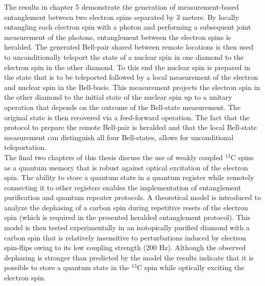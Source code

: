 The results in chapter 5 demonstrate the generation of measurement-based entanglement between two electron spins separated by 3 meters. By locally entangling each electron spin with a photon and performing a subsequent joint measurement of the photons, entanglement between the electron spins is heralded. The generated Bell-pair shared between remote locations is then used to unconditionally teleport the state of a nuclear spin in one diamond to the electron spin in the other diamond. To this end the nuclear spin is prepared in the state that is to be teleported followed by a local measurement of the electron and nuclear spin in the Bell-basis. This measurement projects the electron spin in the other diamond to the initial state of the nuclear spin up to a unitary operation that depends on the outcome of the Bell-state measurement. The original state is then recovered via a feed-forward operation. The fact that the protocol to prepare the remote Bell-pair is heralded and that the local Bell-state measurement can distinguish all four Bell-states, allows for unconditional teleportation. \\

The final two chapters of this thesis discuss the use of weakly coupled $^{13}$C spins as a quantum memory that is robust against optical excitation of the electron spin. The ability to store a quantum state in a quantum register while remotely connecting it to other registers enables the implementation of entanglement purification and quantum repeater protocols. A theoretical model is introduced to analyze the dephasing of a carbon spin during repetitive resets of the electron spin (which is required in the presented heralded entanglement protocol). This model is then tested experimentally in an isotopically purified diamond with a carbon spin that is relatively insensitive to perturbations induced by electron spin-flips owing to its low coupling strength (200 Hz). Although the observed dephasing is stronger than predicted by the model the results indicate that it is possible to store a quantum state in the $^{13}$C spin while optically exciting the electron spin.


